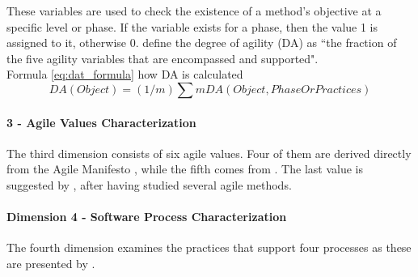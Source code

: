 These variables are used to check the existence of a method's objective at a specific level or phase. If the variable exists for a phase, then the value 1 is assigned to it, otherwise 0. \citet{qumer2006measuring} define the degree of agility (DA) as ``the fraction of the five agility variables that are encompassed and supported".\\ %

Formula \eqref{eq:dat_formula} how DA is calculated\\
\begin{equation} \label{eq:dat_formula} DA (Object) = (1/m) \sum m DA(Object, Phase Or Practices) \end{equation}


\paragraph{3 - Agile Values Characterization}
The third dimension consists of six agile values. Four of them are derived directly from the Agile Manifesto \cite{beck2001agile}, while the fifth comes from \citet{koch2005agile}. The last value is suggested by \citet{qumer2006measuring}, after having studied several agile methods. %


\paragraph{Dimension 4 - Software Process Characterization}
The fourth dimension examines the practices that support four processes as these are presented by \citet{qumer2006measuring}. %

